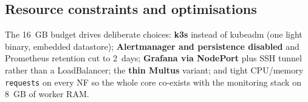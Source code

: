 \subsection{Resource constraints and optimisations}

The 16~GB budget drives deliberate choices: \textbf{k3s} instead of kubeadm
(one light binary, embedded datastore); \textbf{Alertmanager and persistence
disabled} and Prometheus retention cut to 2~days; \textbf{Grafana via NodePort}
plus SSH tunnel rather than a LoadBalancer; the \textbf{thin Multus} variant;
and tight CPU/memory \texttt{requests} on every NF so the whole core
co-exists with the monitoring stack on 8~GB of worker RAM.
